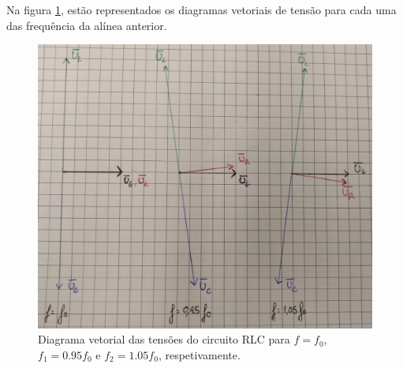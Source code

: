 \documentclass[a4paper, titlepage, portuguese]{article}
\begin{document}
		Na figura \ref{fig:diag_vect}, estão representados os diagramas vetoriais de tensão para cada uma das frequência da alínea anterior.
	
		\begin{figure}[h]
			\centering
			\includegraphics[width=0.6\linewidth]{diag_vect.jpeg}
			\caption{Diagrama vetorial das tensões do circuito RLC para $f=f_0$, $f_1=0.95f_0$ e $f_2=1.05f_0$, respetivamente.}
			\label{fig:diag_vect}
		\end{figure}


\end{document}
